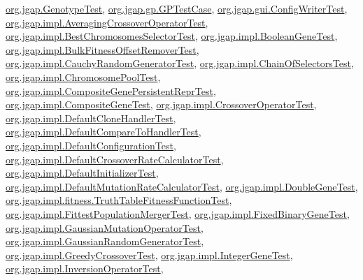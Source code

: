 \hyperlink{classorg_1_1jgap_1_1_genotype_test}{org.\-jgap.\-Genotype\-Test}, \hyperlink{classorg_1_1jgap_1_1gp_1_1_g_p_test_case}{org.\-jgap.\-gp.\-G\-P\-Test\-Case}, \hyperlink{classorg_1_1jgap_1_1gui_1_1_config_writer_test}{org.\-jgap.\-gui.\-Config\-Writer\-Test}, \hyperlink{classorg_1_1jgap_1_1impl_1_1_averaging_crossover_operator_test}{org.\-jgap.\-impl.\-Averaging\-Crossover\-Operator\-Test}, \hyperlink{classorg_1_1jgap_1_1impl_1_1_best_chromosomes_selector_test}{org.\-jgap.\-impl.\-Best\-Chromosomes\-Selector\-Test}, \hyperlink{classorg_1_1jgap_1_1impl_1_1_boolean_gene_test}{org.\-jgap.\-impl.\-Boolean\-Gene\-Test}, \hyperlink{classorg_1_1jgap_1_1impl_1_1_bulk_fitness_offset_remover_test}{org.\-jgap.\-impl.\-Bulk\-Fitness\-Offset\-Remover\-Test}, \hyperlink{classorg_1_1jgap_1_1impl_1_1_cauchy_random_generator_test}{org.\-jgap.\-impl.\-Cauchy\-Random\-Generator\-Test}, \hyperlink{classorg_1_1jgap_1_1impl_1_1_chain_of_selectors_test}{org.\-jgap.\-impl.\-Chain\-Of\-Selectors\-Test}, \hyperlink{classorg_1_1jgap_1_1impl_1_1_chromosome_pool_test}{org.\-jgap.\-impl.\-Chromosome\-Pool\-Test}, \hyperlink{classorg_1_1jgap_1_1impl_1_1_composite_gene_persistent_repr_test}{org.\-jgap.\-impl.\-Composite\-Gene\-Persistent\-Repr\-Test}, \hyperlink{classorg_1_1jgap_1_1impl_1_1_composite_gene_test}{org.\-jgap.\-impl.\-Composite\-Gene\-Test}, \hyperlink{classorg_1_1jgap_1_1impl_1_1_crossover_operator_test}{org.\-jgap.\-impl.\-Crossover\-Operator\-Test}, \hyperlink{classorg_1_1jgap_1_1impl_1_1_default_clone_handler_test}{org.\-jgap.\-impl.\-Default\-Clone\-Handler\-Test}, \hyperlink{classorg_1_1jgap_1_1impl_1_1_default_compare_to_handler_test}{org.\-jgap.\-impl.\-Default\-Compare\-To\-Handler\-Test}, \hyperlink{classorg_1_1jgap_1_1impl_1_1_default_configuration_test}{org.\-jgap.\-impl.\-Default\-Configuration\-Test}, \hyperlink{classorg_1_1jgap_1_1impl_1_1_default_crossover_rate_calculator_test}{org.\-jgap.\-impl.\-Default\-Crossover\-Rate\-Calculator\-Test}, \hyperlink{classorg_1_1jgap_1_1impl_1_1_default_initializer_test}{org.\-jgap.\-impl.\-Default\-Initializer\-Test}, \hyperlink{classorg_1_1jgap_1_1impl_1_1_default_mutation_rate_calculator_test}{org.\-jgap.\-impl.\-Default\-Mutation\-Rate\-Calculator\-Test}, \hyperlink{classorg_1_1jgap_1_1impl_1_1_double_gene_test}{org.\-jgap.\-impl.\-Double\-Gene\-Test}, \hyperlink{classorg_1_1jgap_1_1impl_1_1fitness_1_1_truth_table_fitness_function_test}{org.\-jgap.\-impl.\-fitness.\-Truth\-Table\-Fitness\-Function\-Test}, \hyperlink{classorg_1_1jgap_1_1impl_1_1_fittest_population_merger_test}{org.\-jgap.\-impl.\-Fittest\-Population\-Merger\-Test}, \hyperlink{classorg_1_1jgap_1_1impl_1_1_fixed_binary_gene_test}{org.\-jgap.\-impl.\-Fixed\-Binary\-Gene\-Test}, \hyperlink{classorg_1_1jgap_1_1impl_1_1_gaussian_mutation_operator_test}{org.\-jgap.\-impl.\-Gaussian\-Mutation\-Operator\-Test}, \hyperlink{classorg_1_1jgap_1_1impl_1_1_gaussian_random_generator_test}{org.\-jgap.\-impl.\-Gaussian\-Random\-Generator\-Test}, \hyperlink{classorg_1_1jgap_1_1impl_1_1_greedy_crossover_test}{org.\-jgap.\-impl.\-Greedy\-Crossover\-Test}, \hyperlink{classorg_1_1jgap_1_1impl_1_1_integer_gene_test}{org.\-jgap.\-impl.\-Integer\-Gene\-Test}, \hyperlink{classorg_1_1jgap_1_1impl_1_1_inversion_operator_test}{org.\-jgap.\-impl.\-Inversion\-Operator\-Test}, 